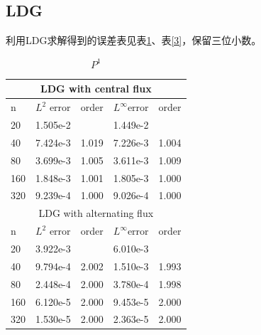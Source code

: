 \documentclass[12pt, a4paper]{ctexart}
\begin{document}
	\subsection{LDG}
	
	利用LDG求解得到的误差表见表\ref{2}、表\ref{3}，保留三位小数。
	\begin{table}[htbp]
		\centering
		\caption{$P^1$}
		\label{2}
		\begin{tabular}{| p{50pt}<{\centering} | p{60pt}<{\centering} | p{60pt}<{\centering} || p{60pt}<{\centering} | p{60pt}<{\centering}|}
			\hline
			\multicolumn{5}{|c|}{LDG with central flux} \\
			\hline
			n & $L^2$ error & order & $L^\infty$error & order \\
			\hline
			20 & 1.505e-2 &  & 1.449e-2 &  \\
			\hline
			40 & 7.424e-3 & 1.019 & 7.226e-3 & 1.004\\
			\hline
			80 & 3.699e-3 & 1.005 & 3.611e-3 & 1.009\\
			\hline
			160 & 1.848e-3 & 1.001 & 1.805e-3 & 1.000\\
			\hline
			320 & 9.239e-4 & 1.000 & 9.026e-4 & 1.000\\
			\hline
			\multicolumn{5}{|c|}{LDG with alternating flux} \\
			\hline
			n & $L^2$ error & order & $L^\infty$error & order \\
			\hline
			20 & 3.922e-3 &  & 6.010e-3 &  \\
			\hline
			40 & 9.794e-4 & 2.002 & 1.510e-3 & 1.993\\
			\hline
			80 & 2.448e-4 & 2.000 & 3.780e-4 & 1.998\\
			\hline
			160 & 6.120e-5 & 2.000 & 9.453e-5 & 2.000\\
			\hline
			320 & 1.530e-5 & 2.000 & 2.363e-5 & 2.000\\
			\hline
		\end{tabular}
	\end{table}
\end{document}
